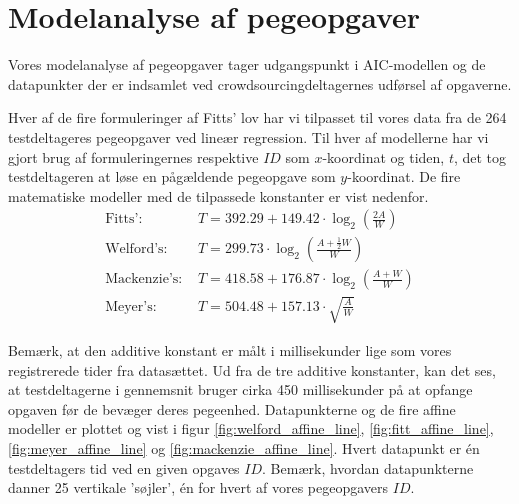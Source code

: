 \begin{minipage}{\linewidth}
\begin{minipage}[t]{.45\linewidth}
		\label{fig:testdeltager7filter}
	\end{minipage}
\end{minipage}

\section*{Modelanalyse af pegeopgaver}
Vores modelanalyse af pegeopgaver tager udgangspunkt i AIC-modellen og de datapunkter der er indsamlet ved crowdsourcingdeltagernes udførsel af opgaverne.

Hver af de fire formuleringer af Fitts' lov har vi tilpasset til vores data fra de 264 testdeltageres pegeopgaver ved lineær regression. Til hver af modellerne har vi gjort brug af formuleringernes respektive $ID$ som $x$-koordinat og tiden, $t$, det tog testdeltageren at løse en pågældende pegeopgave som $y$-koordinat. De fire matematiske modeller med de tilpassede konstanter er vist nedenfor.
\begin{align*}
\text{Fitts': } &T = 392.29 + 149.42\cdot \log_2\left(\frac{2A}{W}\right)\\
\text{Welford's: } &T =  299.73\cdot \log_2\left(\frac{A+\frac{1}{2}W}{W}\right)\\
\text{Mackenzie's: } &T = 418.58 + 176.87\cdot \log_2\left(\frac{A+W}{W}\right)\\
\text{Meyer's: } &T = 504.48 + 157.13 \cdot \sqrt{\frac{A}{W}}
\end{align*}

Bemærk, at den additive konstant er målt i millisekunder lige som vores registrerede tider fra datasættet. Ud fra de tre additive konstanter, kan det ses, at testdeltagerne i gennemsnit bruger cirka 450 millisekunder på at opfange opgaven før de bevæger deres pegeenhed. Datapunkterne og de fire affine modeller er plottet og vist i figur \ref{fig:welford_affine_line}, \ref{fig:fitt_affine_line}, \ref{fig:meyer_affine_line} og \ref{fig:mackenzie_affine_line}. Hvert datapunkt er én testdeltagers tid ved en given opgaves $ID$. Bemærk, hvordan datapunkterne danner 25 vertikale 'søjler', én for hvert af vores pegeopgavers $ID$.

